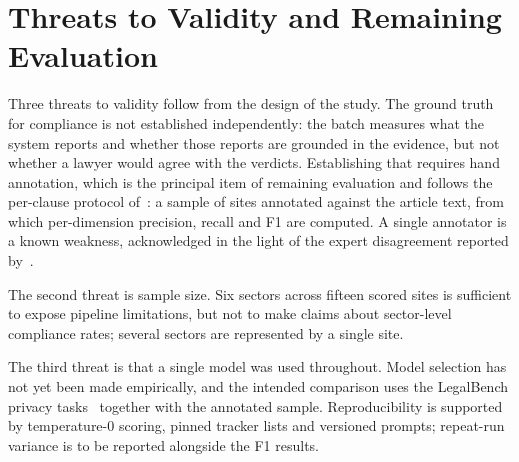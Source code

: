 \documentclass[conference]{IEEEtran}
\begin{document}
\section{Threats to Validity and Remaining Evaluation}
\label{sec:evalplan}
Three threats to validity follow from the design of the study. The ground truth for compliance is not established independently: the batch measures what the system reports and whether those reports are grounded in the evidence, but not whether a lawyer would agree with the verdicts. Establishing that requires hand annotation, which is the principal item of remaining evaluation and follows the per-clause protocol of~\cite{xie-2025-llmpolicy}: a sample of sites annotated against the article text, from which per-dimension precision, recall and F1 are computed. A single annotator is a known weakness, acknowledged in the light of the expert disagreement reported by~\cite{ravichander-2019-privacyqa}.

The second threat is sample size. Six sectors across fifteen scored sites is sufficient to expose pipeline limitations, but not to make claims about sector-level compliance rates; several sectors are represented by a single site.

The third threat is that a single model was used throughout. Model selection has not yet been made empirically, and the intended comparison uses the LegalBench privacy tasks~\cite{guha-2023-legalbench} together with the annotated sample. Reproducibility is supported by temperature-0 scoring, pinned tracker lists and versioned prompts; repeat-run variance is to be reported alongside the F1 results.

\end{document}
